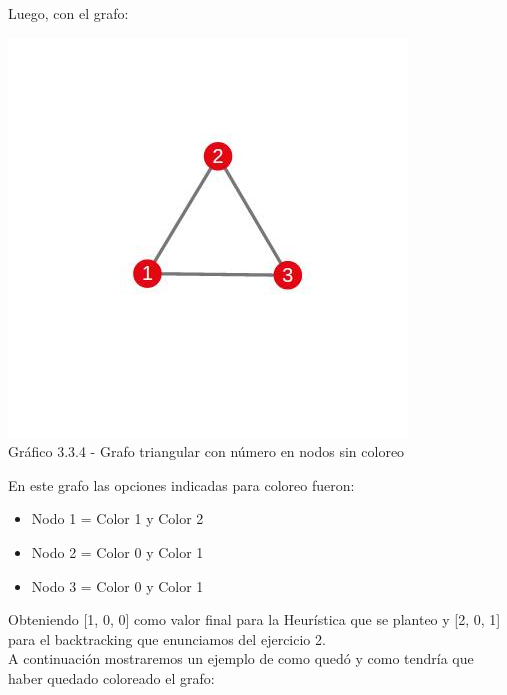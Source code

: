 Luego, con el grafo:\\

\vspace*{0.3cm} \vspace*{0.3cm}
  \begin{center}
 \includegraphics[scale=0.5]{./ej3/parte3/grafo2.jpg}
 	{\\Gráfico 3.3.4 - Grafo triangular con número en nodos sin coloreo}
  \end{center}
  \vspace*{0.3cm}
  
En este grafo las opciones indicadas para coloreo fueron:\\
\begin{itemize}
\item Nodo 1 = Color 1 y Color 2
\item Nodo 2 = Color 0 y Color 1
\item Nodo 3 = Color 0 y Color 1
\end{itemize}

Obteniendo  [1, 0, 0] como valor final para la Heurística que se planteo y [2, 0, 1] para el backtracking que enunciamos del ejercicio 2.\\

A continuación mostraremos un ejemplo de como quedó y como tendría que haber quedado coloreado el grafo:\\

